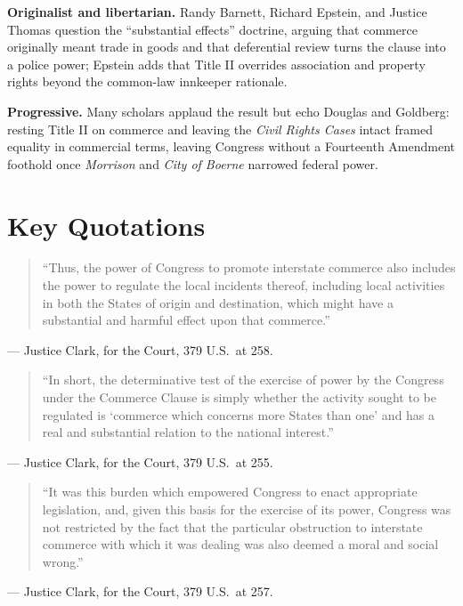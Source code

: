 \documentclass[12pt]{article}
\begin{document}
\textbf{Originalist and libertarian.} Randy Barnett, Richard Epstein, and Justice Thomas question the ``substantial effects'' doctrine, arguing that commerce originally meant trade in goods and that deferential review turns the clause into a police power; Epstein adds that Title II overrides association and property rights beyond the common-law innkeeper rationale.

\textbf{Progressive.} Many scholars applaud the result but echo Douglas and Goldberg: resting Title II on commerce and leaving the \textit{Civil Rights Cases} intact framed equality in commercial terms, leaving Congress without a Fourteenth Amendment foothold once \textit{Morrison} and \textit{City of Boerne} narrowed federal power.

\section{Key Quotations}

\begin{quote}
``Thus, the power of Congress to promote interstate commerce also includes the power to regulate the local incidents thereof, including local activities in both the States of origin and destination, which might have a substantial and harmful effect upon that commerce.''
\end{quote}
\noindent --- Justice Clark, for the Court, 379 U.S.\ at 258.

\begin{quote}
``In short, the determinative test of the exercise of power by the Congress under the Commerce Clause is simply whether the activity sought to be regulated is `commerce which concerns more States than one' and has a real and substantial relation to the national interest.''
\end{quote}
\noindent --- Justice Clark, for the Court, 379 U.S.\ at 255.

\begin{quote}
``It was this burden which empowered Congress to enact appropriate legislation, and, given this basis for the exercise of its power, Congress was not restricted by the fact that the particular obstruction to interstate commerce with which it was dealing was also deemed a moral and social wrong.''
\end{quote}
\noindent --- Justice Clark, for the Court, 379 U.S.\ at 257.
\end{document}
